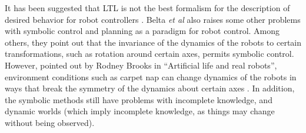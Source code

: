 %	
%			
It has been suggested that LTL is not the best formalism for the description of desired behavior for robot controllers \citep{belta2007symbolic}.
Belta \emph{et al} also raises some other problems with symbolic control and planning as a paradigm for robot control. 
Among others, they point out that the invariance of the dynamics of the robots to certain transformations, such as rotation around certain axes, permits symbolic control. 
However, pointed out by Rodney Brooks in ``Artificial life and real robots'', environment conditions such as carpet nap can change dynamics of the robots in ways that break the symmetry of the dynamics about certain axes \citep{brooks1992artificial}.
In addition, the symbolic methods still have problems with incomplete knowledge, and dynamic worlds (which imply incomplete knowledge, as things may change without being observed). 
